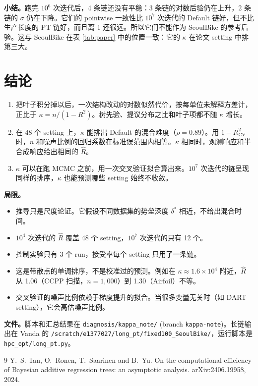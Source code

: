\documentclass[11pt]{article}
\newcommand{\Rhat}{\hat R}
\begin{document}
\textbf{小结。}跑完 $10^6$ 次迭代后，4 条链还没有平稳：3 条链的对数后验仍在上升，2 条链的 $\sigma$ 仍在下降。它们的 pointwise 一致性比 $10^7$ 次迭代的 Default 链好，但不比生产长度的 PT 链好，而且离 1 还很远。所以它们不能作为 SeoulBike 的参考后验。这与 SeoulBike 在表 \ref{tab:paper} 中的位置一致：它的 $\kappa$ 在论文 setting 中排第三大。

\section{结论}
\begin{enumerate}
\item 把叶子积分掉以后，一次结构改动的对数似然代价，按每单位未解释方差计，正比于 $\kappa=n/(1-R^2)$。树先验、提议分布之比和叶子项都不随 $\kappa$ 增长。
\item 在 48 个 setting 上，$\kappa$ 能排出 Default 的混合难度（$\rho=0.89$）。用 $1-R^2_{\mathrm{CV}}$ 时，$n$ 和噪声比例的回归系数在标准误范围内相等。$\kappa$ 相同时，观测响应和半合成响应给出相同的 $\Rhat$。
\item $\kappa$ 可以在跑 MCMC 之前，用一次交叉验证拟合算出来。$10^7$ 次迭代的链呈现同样的排序，$\kappa$ 也能预测哪些 setting 始终不收敛。
\end{enumerate}

\textbf{局限。}
\begin{itemize}
\item 推导只是尺度论证。它假设不同数据集的势垒深度 $\delta^\ast$ 相近，不给出混合时间。
\item $10^4$ 次迭代的 $\Rhat$ 覆盖 48 个 setting，$10^7$ 次迭代的只有 12 个。
\item 控制实验只有 3 个 run，接受率每个 setting 只用了一条链。
\item 这是带散点的单调排序，不是校准过的预测。例如在 $\kappa\approx1.6\times10^4$ 附近，$\Rhat$ 从 1.06（CCPP 扫描，$n=1{,}000$）到 1.30（Airfoil）不等。
\item 交叉验证的噪声比例依赖于梯度提升的拟合。当很多变量无关时（如 DART setting），它会高估噪声比例。
\end{itemize}

\textbf{文件。}脚本和汇总结果在 \texttt{diagnosis/kappa\_note/} (branch \texttt{kappa-note})。长链输出在 Vanda 的 \texttt{/scratch/e1377027/long\_pt/fixed100\_SeoulBike/}，运行脚本是 \texttt{hpc\_opt/long\_pt.py}。

\begin{thebibliography}{9}
Y.~S. Tan, O.~Ronen, T.~Saarinen and B.~Yu.
\newblock On the computational efficiency of Bayesian additive regression trees: an asymptotic analysis.
\newblock arXiv:2406.19958, 2024.
\end{thebibliography}
\end{document}
